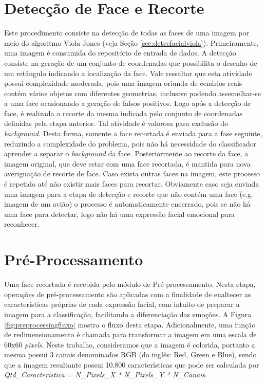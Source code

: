 \section{Detecção de Face e Recorte}\label{sec:detect}
Este procedimento consiste na detecção de todas as faces de uma imagem por meio do algoritmo Viola Jones (veja Seção \ref{sec:detecfacialviola}). Primeiramente, uma imagem é consumida do repositório de entrada de dados. A detecção consiste na geração de um conjunto de coordenadas que possibilita o desenho de um retângulo indicando a localização da face. Vale ressaltar que esta atividade possui complexidade moderada, pois uma imagem oriunda de cenários reais contém vários objetos com diferentes geometrias, inclusive podendo assemelhar-se a uma face ocasionando a geração de falsos positivos. Logo após a detecção de face, é realizada o recorte da mesma indicada pelo conjunto de coordenadas definidas pela etapa anterior. Tal atividade é valorosa para exclusão do \textit{background}. Desta forma, somente a face recortada é enviada para a fase seguinte, reduzindo a complexidade do problema, pois não há necessidade do classificador aprender a separar o \textit{background} da face. Posteriormente ao recorte da face, a imagem original, que deve estar com uma face recortada, é mantida para nova averiguação de recorte de face. Caso exista outras faces na imagem, este processo é repetido até não existir mais faces para recortar. Obviamente caso seja enviada uma imagem para a etapa de detecção e recorte que não contém uma face (e.g. imagem de um avião) o processo é automaticamente encerrado, pois se não há uma face para detectar, logo não há uma expressão facial emocional para reconhecer. 

\section{Pré-Processamento}\label{sec:preproc}
Uma face recortada é recebida pelo módulo de Pré-processamento. Nesta etapa, operações de pré-processamento são aplicadas com a finalidade de enaltecer as características próprias de cada expressão facial, com intuito de preparar a imagem para a classificação, facilitando a diferenciação das emoções. A Figura \ref{fig:preprocessingfluxo} mostra o fluxo desta etapa. Adicionalmente, uma função de redimensionamento é chamada para transformar a imagem em uma escala de 60x60 \textit{pixels}. Neste trabalho, consideramos que a imagem é colorida, portanto a mesma possui 3 canais denominados RGB (do inglês: Red, Green e Blue), sendo que a imagem resultante possui 10.800 características que pode ser calculada por \textit{Qtd_Caracteristica = N_Pixels_X * N_Pixels_Y * N_Canais}. 

